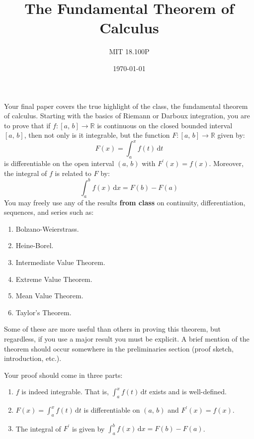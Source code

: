 \documentclass{article}
\title{The Fundamental Theorem of Calculus}
\author{MIT 18.100P}
\date{\today}
\begin{document}
    \maketitle
    Your final paper covers the true highlight of the class, the fundamental
    theorem of calculus. Starting with the basics of Riemann or Darboux
    integration, you are to prove that if $f:[a,\,b]\rightarrow\mathbb{R}$
    is continuous on the closed bounded interval $[a,\,b]$,
    then not only is it integrable, but the function
    $F:[a,\,b]\rightarrow\mathbb{R}$ given by:
    \begin{equation}
        F(x)=\int_{a}^{x}f(t)\,\textrm{d}t
    \end{equation}
    is differentiable on the open interval $(a,\,b)$ with
    $F^{\prime}(x)=f(x)$. Moreover, the integral of $f$ is related to $F$
    by:
    \begin{equation}
        \int_{a}^{b}f(x)\,\textrm{d}x=F(b)-F(a)
    \end{equation}
    You may freely use any of the results \textbf{from class} on continuity,
    differentiation, sequences, and series such as:
    \begin{enumerate}
        \item
            Bolzano-Weierstrass.
        \item
            Heine-Borel.
        \item
            Intermediate Value Theorem.
        \item
            Extreme Value Theorem.
        \item
            Mean Value Theorem.
        \item
            Taylor's Theorem.
    \end{enumerate}
    Some of these are more useful than others in proving this theorem,
    but regardless, if you use a major result you must be explicit.
    A brief mention of the theorem should occur somewhere in the
    preliminaries section (proof sketch, introduction, etc.).
    \par\hfill\par
    Your proof should come in three parts:
    \begin{enumerate}
        \item
            $f$ is indeed integrable. That is, $\int_{a}^{x}f(t)\,\textrm{d}t$
            exists and is well-defined.
        \item
            $F(x)=\int_{a}^{x}f(t)\,\textrm{d}t$ is differentiable on $(a,\,b)$
            and $F^{\prime}(x)=f(x)$.
        \item
            The integral of $F^{\prime}$ is given by
            $\int_{a}^{b}f(x)\,\textrm{d}x=F(b)-F(a)$.
    \end{enumerate}
\end{document}
